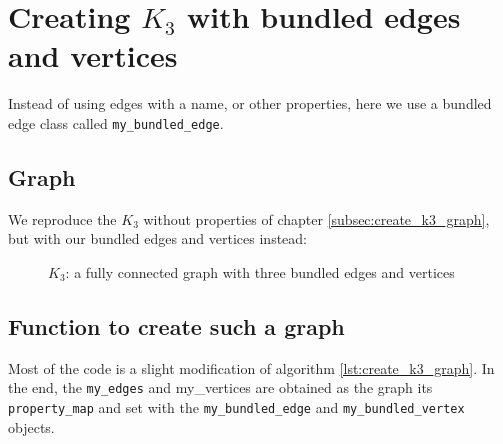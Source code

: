 \section{Creating $K_{3}$  with bundled edges and vertices}
\label{subsec:create_bundled_edges_and_vertices_k3}

Instead of using edges with a name, or other properties, here we use a bundled
edge class called \verb;my_bundled_edge;.

\subsection{Graph}

We reproduce the $K_{3}$ without properties of chapter 
\ref{subsec:create_k3_graph}, but with our bundled edges and vertices instead:

\begin{figure}
  \caption{$K_{3}$: a fully connected graph with three bundled edges and vertices }
  \label{fig:create_bundled_edges_and_vertices_k3}
\end{figure}

\subsection{Function to create such a graph}



Most of the code is a slight modification of algorithm 
\ref{lst:create_k3_graph}.
In the end, the \verb;my_edges; and my\_vertices are obtained as the graph its
\verb;property_map; and set with the \verb;my_bundled_edge; 
and \verb;my_bundled_vertex; objects.


